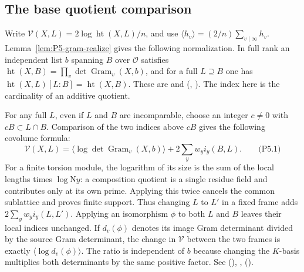 \subsection{The base quotient comparison}
Write $\mathcal V(X,L)=2\log\operatorname{ht}(X,L)/n$, and use
$\langle h_v\rangle=(2/n)\sum_{v\mid\infty}h_v$.
Lemma~\ref{lem:P5-gram-realize} gives the following normalization.
In full rank an independent list $b$ spanning
$B$ over $\mathcal O$ satisfies
$\operatorname{ht}(X,B)=\prod_v\det\operatorname{Gram}_v(X,b)$, and for a
full $L\supseteq B$ one has $\operatorname{ht}(X,L)[L:B]=\operatorname{ht}(X,B)$.
These are  and
 (,
). The index here is the cardinality of an additive
quotient.

For any full $L$, even if $L$ and $B$ are incomparable, choose an integer
$c\ne0$ with $cB\subset L\cap B$. Comparison of the two indices above $cB$
gives the following covolume formula:
\[
 \mathcal V(X,L)=
 \big\langle\log\det\operatorname{Gram}_v(X,b)\big\rangle
                          +2\sum_y w_y i_y(B,L).                 \qquad\text{(P5.1)}
\]
For a finite torsion module, the logarithm of its size is the sum of the
local lengths times $\log\mathrm N y$: a composition quotient is a single
residue field and contributes only at its own prime. Applying this twice
cancels the common sublattice and proves finite support. Thus changing $L$
to $L'$ in a fixed frame adds $2\sum_yw_y i_y(L,L')$. Applying an
isomorphism $\phi$ to both $L$ and $B$ leaves their local indices unchanged.
If $d_v(\phi)$ denotes its image Gram determinant divided by the source Gram
determinant, the change in $\mathcal V$ between the two frames is exactly
$\langle\log d_v(\phi)\rangle$. The ratio is independent of $b$ because
changing the $K$-basis multiplies both determinants by the same positive
factor. See  (),
,  ().

